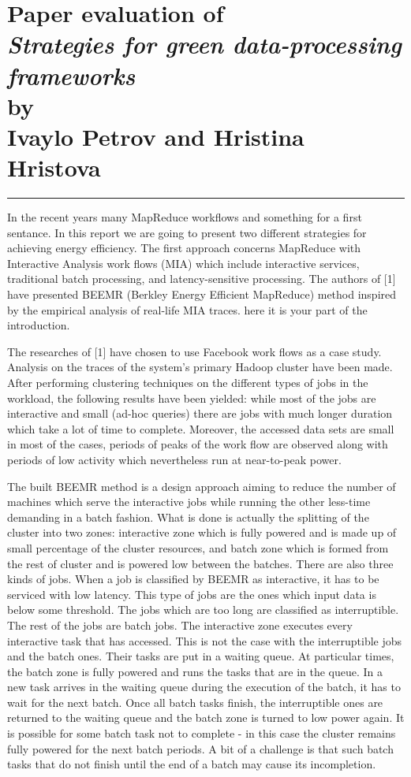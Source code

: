 \documentclass[9pt, a4paper]{article}
\newcommand{\hr}{\rule{\linewidth}{0.1mm}}
\theoremstyle{plain}
\begin{document}


\section*{\centering
  Paper evaluation of\\
  \emph{Strategies for green data-processing frameworks}\\
  by\\
  Ivaylo Petrov and Hristina Hristova
}

\hr

In the recent years many MapReduce workflows and {something for a first sentance}.
In this report we are going to present two different strategies for achieving
energy efficiency. The first approach concerns MapReduce with Interactive Analysis
work flows (MIA) which include interactive services, traditional batch processing, and
latency-sensitive processing. The authors of [1] have presented
BEEMR (Berkley Energy Efficient MapReduce) method inspired by the empirical analysis
of real-life MIA traces. {here it is your part of the introduction}.

The researches of [1] have chosen to use Facebook work flows as a case study. Analysis
on the traces of the system's primary Hadoop cluster have been made. After performing
clustering techniques on the different types of jobs in the workload, the following
results have been yielded: while most of the jobs are interactive and small (ad-hoc
queries) there are jobs with much longer duration which take a lot of time to complete.
Moreover, the accessed data sets are small in most of the cases, periods of peaks of the work flow
are observed along with periods of low activity which nevertheless run at near-to-peak
power.

The built BEEMR method is a design approach aiming to reduce the number of
machines which serve the interactive jobs while running the other less-time demanding
in a batch fashion. What is done is actually the splitting of the cluster into
two zones: interactive zone which is fully powered and is made up of small percentage
of the cluster resources, and batch zone which is formed from the rest of cluster
and is powered low between the batches. There are also three kinds of jobs. When
a job is classified by BEEMR as interactive, it has to be serviced with low latency.
This type of jobs are the ones which input data is below some threshold. The jobs
which are too long are classified as interruptible. The rest of the jobs are batch jobs.
The interactive zone executes every interactive task that has accessed. This is
not the case with the interruptible jobs and the batch ones. Their tasks are put in a waiting queue.
At particular times, the batch zone is fully powered and runs the tasks that are in
the queue. In a new task arrives in the waiting queue during the execution of the
batch, it has to wait for the next batch. Once all batch tasks finish, the interruptible
ones are returned to the waiting queue and the batch zone is turned to low power again.
It is possible for some batch task not to complete - in this case the cluster remains fully
powered for the next batch periods. A bit of a challenge is that such batch tasks that
do not finish until the end of a batch may cause its incompletion.
\end{document}
